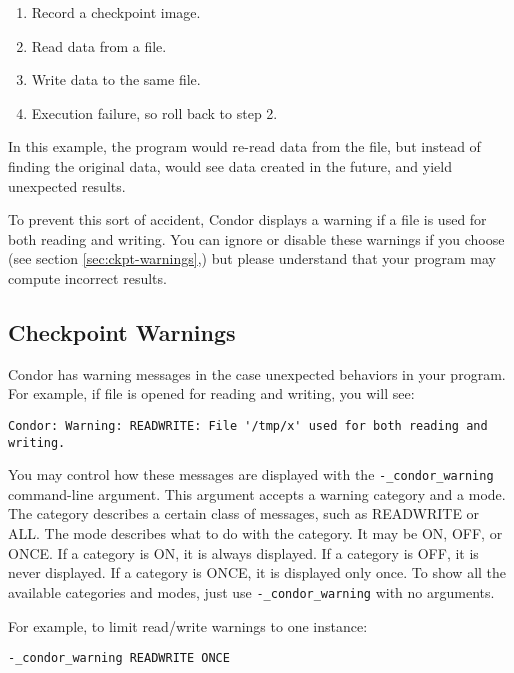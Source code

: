 \begin{enumerate}
\item Record a checkpoint image.
\item Read data from a file.
\item Write data to the same file.
\item Execution failure, so roll back to step 2.
\end{enumerate}

In this example, the program would re-read data from the file, but
instead of finding the original data, would see data created in the
future, and yield unexpected results.

To prevent this sort of accident, Condor displays a warning
if a file is used for both reading and writing.  You can ignore or disable
these warnings if you choose (see section \ref{sec:ckpt-warnings},) but
please understand that your program may compute incorrect results.

\subsection{\label{sec:ckpt-warnings}Checkpoint Warnings}

Condor has warning messages in the case unexpected
behaviors in your program.  For example, if file 
is opened for reading
and writing, you will see:

\footnotesize
\begin{verbatim}
Condor: Warning: READWRITE: File '/tmp/x' used for both reading and writing.
\end{verbatim}
\normalsize

You may control how these messages are displayed with the
\verb$-_condor_warning$ command-line argument.  This argument
accepts a warning category and a mode.  The category describes a certain
class of messages, such as READWRITE or ALL.  The mode describes what
to do with the category.  It may be ON, OFF, or ONCE.
If a category is ON, it is always displayed.
If a category is OFF, it is never displayed.
If a category is ONCE, it is displayed only once.
To show all the available categories and modes, just use
\verb$-_condor_warning$ with no arguments.

For example, to limit read/write warnings to one instance:

\begin{verbatim}
-_condor_warning READWRITE ONCE
\end{verbatim}

